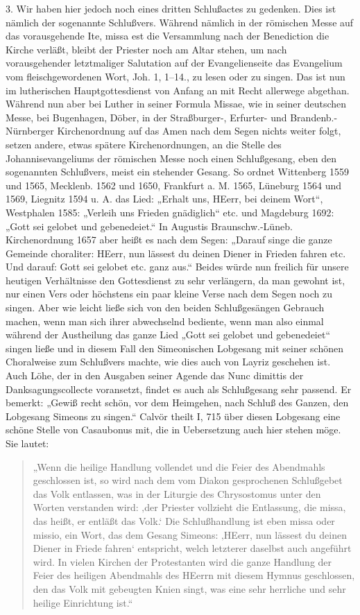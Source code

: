 3. Wir haben hier jedoch noch eines dritten Schlußactes zu gedenken. Dies ist nämlich der sogenannte Schlußvers. Während nämlich in der römischen Messe auf das vorausgehende Ite, missa est die Versammlung nach der Benediction die Kirche verläßt, bleibt der Priester noch am Altar stehen, um nach vorausgehender letztmaliger Salutation auf der Evangelienseite das Evangelium vom fleischgewordenen Wort, Joh. 1, 1–14., zu lesen oder zu singen. Das ist nun im lutherischen Hauptgottesdienst von Anfang an mit Recht allerwege abgethan. Während nun aber bei Luther in seiner Formula Missae, wie in seiner deutschen Messe, bei Bugenhagen, Döber, in der Straßburger-, Erfurter- und Brandenb.-Nürnberger Kirchenordnung auf das Amen nach dem Segen nichts weiter folgt, setzen andere, etwas spätere Kirchenordnungen, an die Stelle des Johannisevangeliums der römischen Messe noch einen Schlußgesang, eben den sogenannten Schlußvers, meist ein stehender Gesang. So ordnet Wittenberg 1559 und 1565, Mecklenb. 1562 und 1650, Frankfurt a. M. 1565, Lüneburg 1564 und 1569, Liegnitz 1594 u. A. das Lied: „Erhalt uns, HEerr, bei deinem Wort“, Westphalen 1585: „Verleih uns Frieden gnädiglich“ etc. und Magdeburg 1692: „Gott sei gelobet und gebenedeiet.“ In
Augustis Braunschw.-Lüneb. Kirchenordnung 1657 aber heißt es nach dem Segen: „Darauf singe die ganze Gemeinde choraliter: HEerr, nun lässest du deinen Diener in Frieden fahren etc. Und darauf: Gott sei gelobet etc. ganz aus.“ Beides würde nun freilich für unsere heutigen Verhältnisse den Gottesdienst zu sehr verlängern, da man gewohnt ist, nur einen Vers oder höchstens ein paar kleine Verse nach dem Segen noch zu singen. Aber wie leicht ließe sich von den beiden Schlußgesängen Gebrauch machen, wenn man sich ihrer abwechselnd bediente, wenn man also einmal während der Austheilung das ganze Lied „Gott sei gelobet und gebenedeiet“ singen ließe und in diesem Fall den Simeonischen Lobgesang mit seiner schönen Choralweise zum Schlußvers machte, wie dies auch von Layriz geschehen ist. Auch Löhe, der in den Ausgaben seiner Agende das Nunc dimittis der Danksagungscollecte voransetzt, findet es auch als Schlußgesang sehr passend. Er bemerkt: „Gewiß recht schön, vor dem Heimgehen, nach Schluß des Ganzen, den Lobgesang Simeons zu singen.“ Calvör theilt I, 715 über diesen Lobgesang eine schöne Stelle von Casaubonus mit, die in Uebersetzung auch hier stehen möge. Sie lautet:

\begin{quote}
„Wenn die heilige Handlung vollendet und die Feier des Abendmahls geschlossen ist, so wird nach dem vom Diakon gesprochenen Schlußgebet das Volk entlassen, was in der Liturgie des Chrysostomus unter den Worten verstanden wird: ‚der Priester vollzieht die Entlassung, die missa, das heißt, er entläßt das Volk.‘ Die Schlußhandlung ist eben missa oder missio, ein Wort, das dem Gesang Simeons: ‚HEerr, nun lässest du deinen Diener in Friede fahren‘ entspricht, welch letzterer daselbst auch angeführt wird. In vielen Kirchen der Protestanten wird die ganze Handlung der Feier des heiligen Abendmahls des HEerrn mit diesem Hymnus geschlossen, den das Volk mit gebeugten Knien singt, was eine sehr herrliche und sehr heilige Einrichtung ist.“
\end{quote}

